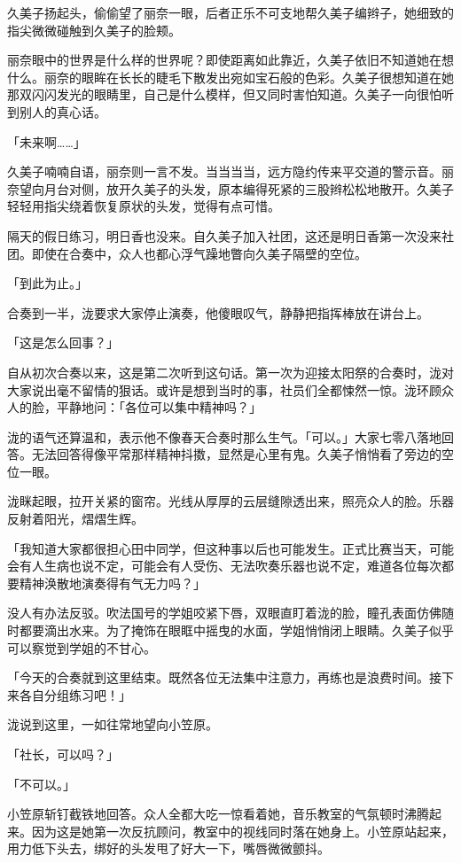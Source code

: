 \documentclass[UTF8]{ctexart}
\begin{document}
    久美子扬起头，偷偷望了丽奈一眼，后者正乐不可支地帮久美子编辫子，她细致的指尖微微碰触到久美子的脸颊。 

    丽奈眼中的世界是什么样的世界呢？即使距离如此靠近，久美子依旧不知道她在想什么。丽奈的眼眸在长长的睫毛下散发出宛如宝石般的色彩。久美子很想知道在她那双闪闪发光的眼睛里，自己是什么模样，但又同时害怕知道。久美子一向很怕听到别人的真心话。 

    「未来啊……」 

    久美子喃喃自语，丽奈则一言不发。当当当当，远方隐约传来平交道的警示音。丽奈望向月台对侧，放开久美子的头发，原本编得死紧的三股辫松松地散开。久美子轻轻用指尖绕着恢复原状的头发，觉得有点可惜。 

    隔天的假日练习，明日香也没来。自久美子加入社团，这还是明日香第一次没来社团。即使在合奏中，众人也都心浮气躁地瞥向久美子隔壁的空位。 

    「到此为止。」 

    合奏到一半，泷要求大家停止演奏，他傻眼叹气，静静把指挥棒放在讲台上。 

    「这是怎么回事？」 

    自从初次合奏以来，这是第二次听到这句话。第一次为迎接太阳祭的合奏时，泷对大家说出毫不留情的狠话。或许是想到当时的事，社员们全都悚然一惊。泷环顾众人的脸，平静地问：「各位可以集中精神吗？」 

    泷的语气还算温和，表示他不像春天合奏时那么生气。「可以。」大家七零八落地回答。无法回答得像平常那样精神抖擞，显然是心里有鬼。久美子悄悄看了旁边的空位一眼。 

    泷眯起眼，拉开关紧的窗帘。光线从厚厚的云层缝隙透出来，照亮众人的脸。乐器反射着阳光，熠熠生辉。 

    「我知道大家都很担心田中同学，但这种事以后也可能发生。正式比赛当天，可能会有人生病也说不定，可能会有人受伤、无法吹奏乐器也说不定，难道各位每次都要精神涣散地演奏得有气无力吗？」 

    没人有办法反驳。吹法国号的学姐咬紧下唇，双眼直盯着泷的脸，瞳孔表面仿佛随时都要滴出水来。为了掩饰在眼眶中摇曳的水面，学姐悄悄闭上眼睛。久美子似乎可以察觉到学姐的不甘心。 

    「今天的合奏就到这里结束。既然各位无法集中注意力，再练也是浪费时间。接下来各自分组练习吧！」 

    泷说到这里，一如往常地望向小笠原。 

    「社长，可以吗？」 

    「不可以。」 

    小笠原斩钉截铁地回答。众人全都大吃一惊看着她，音乐教室的气氛顿时沸腾起来。因为这是她第一次反抗顾问，教室中的视线同时落在她身上。小笠原站起来，用力低下头去，绑好的头发甩了好大一下，嘴唇微微颤抖。 
\end{document}
